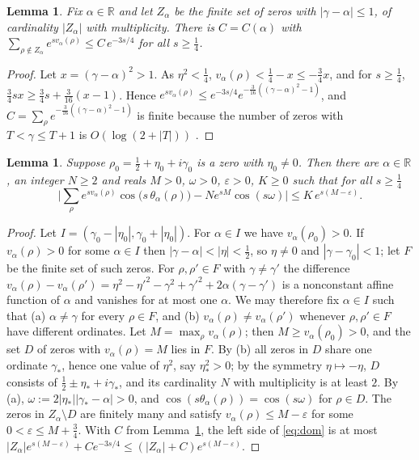 \documentclass[11pt]{amsart}
\newtheorem{lemma}[theorem]{Lemma}
\theoremstyle{remark}
\newcommand{\R}{\mathbb{R}}
\begin{document}
\begin{lemma}\label{lem:tail}
Fix $\alpha\in\R$ and let $Z_\alpha$ be the finite set of zeros with $|\gamma-\alpha|\le1$, of cardinality $|Z_\alpha|$ with multiplicity. There is $C=C(\alpha)$ with
$\sum_{\rho\notin Z_\alpha}e^{sv_\alpha(\rho)}\le C\,e^{-3s/4}$ for all $s\ge\tfrac14$.
\end{lemma}
\begin{proof}
Let $x=(\gamma-\alpha)^2>1$. As $\eta^2<\tfrac14$, $v_\alpha(\rho)<\tfrac14-x\le-\tfrac34x$, and for $s\ge\tfrac14$,
$\tfrac34sx\ge\tfrac34s+\tfrac3{16}(x-1)$. Hence $e^{sv_\alpha(\rho)}\le e^{-3s/4}e^{-\frac3{16}((\gamma-\alpha)^2-1)}$, and
$C=\sum_\rho e^{-\frac3{16}((\gamma-\alpha)^2-1)}$ is finite because the number of zeros with $T<\gamma\le T+1$ is
$O(\log(2+|T|))$ \cite[Thm.~9.2]{Titchmarsh}.
\end{proof}

\begin{lemma}\label{lem:dominant}
Suppose $\rho_0=\tfrac12+\eta_0+i\gamma_0$ is a zero with $\eta_0\ne0$. Then there are $\alpha\in\R$, an integer
$N\ge2$ and reals $M>0$, $\omega>0$, $\varepsilon>0$, $K\ge0$ such that for all $s\ge\tfrac14$
\begin{equation}\label{eq:dom}
\Big|\sum_\rho e^{sv_\alpha(\rho)}\cos\big(s\,\theta_\alpha(\rho)\big)-N e^{sM}\cos(s\omega)\Big|\le K\,e^{s(M-\varepsilon)} .
\end{equation}
\end{lemma}
\begin{proof}
Let $I=(\gamma_0-|\eta_0|,\gamma_0+|\eta_0|)$. For $\alpha\in I$ we have $v_\alpha(\rho_0)>0$. If $v_\alpha(\rho)>0$ for
some $\alpha\in I$ then $|\gamma-\alpha|<|\eta|<\tfrac12$, so $\eta\ne0$ and $|\gamma-\gamma_0|<1$; let $F$ be the finite
set of such zeros. For $\rho,\rho'\in F$ with $\gamma\ne\gamma'$ the difference
$v_\alpha(\rho)-v_\alpha(\rho')=\eta^2-\eta'^2-\gamma^2+\gamma'^2+2\alpha(\gamma-\gamma')$ is a nonconstant affine
function of $\alpha$ and vanishes for at most one $\alpha$. We may therefore fix $\alpha\in I$ such that
(a) $\alpha\ne\gamma$ for every $\rho\in F$, and (b) $v_\alpha(\rho)\ne v_\alpha(\rho')$ whenever $\rho,\rho'\in F$
have different ordinates. Let $M=\max_\rho v_\alpha(\rho)$; then $M\ge v_\alpha(\rho_0)>0$, and the set $D$ of zeros with
$v_\alpha(\rho)=M$ lies in $F$. By (b) all zeros in $D$ share one ordinate $\gamma_*$, hence one value of $\eta^2$, say
$\eta_*^2>0$; by the symmetry $\eta\mapsto-\eta$, $D$ consists of $\tfrac12\pm\eta_*+i\gamma_*$, and its cardinality
$N$ with multiplicity is at least $2$. By (a), $\omega:=2|\eta_*||\gamma_*-\alpha|>0$, and
$\cos(s\theta_\alpha(\rho))=\cos(s\omega)$ for $\rho\in D$. The zeros in $Z_\alpha\setminus D$ are finitely many and
satisfy $v_\alpha(\rho)\le M-\varepsilon$ for some $0<\varepsilon\le M+\tfrac34$. With $C$ from Lemma~\ref{lem:tail},
the left side of \eqref{eq:dom} is at most $|Z_\alpha|e^{s(M-\varepsilon)}+Ce^{-3s/4}\le(|Z_\alpha|+C)e^{s(M-\varepsilon)}$.
\end{proof}
\end{document}

